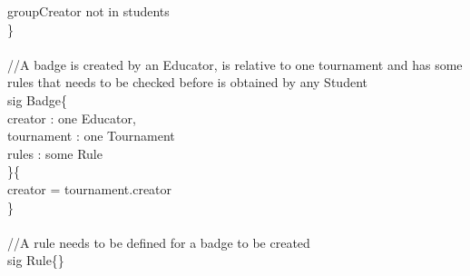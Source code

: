 \documentclass{article}
\begin{document}
{\-\hspace{1cm}    groupCreator \color{blue} not in \color{black} students	\\
\}\\
\\
\color{gray}
//A badge is created by an Educator, is relative to one tournament and has some rules that needs to be checked before is obtained by any Student\\
\color{blue}
sig
\color{black}
Badge\{\\
\-\hspace{1cm}    creator : \color{blue} one \color{black} Educator,\\
\-\hspace{1cm}    tournament : \color{blue} one \color{black} Tournament\\
\-\hspace{1cm}    rules : \color{blue} some \color{black} Rule\\
\}\{\\
\-\hspace{1cm}    creator \color{blue} = \color{black} tournament.creator\\
\}\\
\\
\newpage
\noindent
\color{gray}
//A rule needs to be defined for a badge to be created\\
\color{blue}
sig
\color{black}
Rule\{\}\\

}
\end{document}
